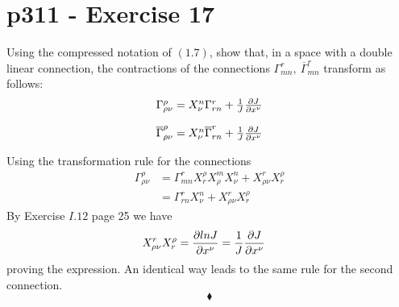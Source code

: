 \section{p311 - Exercise 17}
\begin{tcolorbox}
Using the compressed notation of $\mathbf{(1.7)}$, show that, in a  space with a double linear connection, the contractions of the connections $\Gamma^r_{mn}, \ \overline{\Gamma}^r_{mn}$ transform as follows:
$$\begin{matrix}
\Gamma^{\rho}_{\rho\nu}= X^{n}_{\nu}\Gamma^r_{rn}+ \frac{1}{J}\pdv{J}{x^{\nu}}\\\\
\overline{\Gamma}^{\rho}_{\rho\nu}= X^{n}_{\nu}\overline{\Gamma}^r_{rn}+ \frac{1}{J}\pdv{J}{x^{\nu}}
\end{matrix}$$
\end{tcolorbox}
Using the transformation rule for the connections
\begin{align}
\Gamma^{\rho}_{\rho\nu} &=  \Gamma^r_{mn}X^{\rho}_{r}X^{m}_{\rho}X^{n}_{\nu}+X^{r}_{\rho \nu}X^{\rho}_{r}\\
&=  \Gamma^r_{rn}X^{n}_{\nu}+X^{r}_{\rho \nu}X^{\rho}_{r}
\end{align}
By Exercise $I.12$ page 25 we have
 \begin{align}
X^{r}_{\rho \nu}X^{\rho}_{r}&= \pdv{ln J}{x^{\nu}}= \frac{1}{J}\pdv{J}{x^{\nu}}
\end{align}
proving the expression. An identical way leads to the same rule for the second connection.
$$\blacklozenge$$
\newpage




